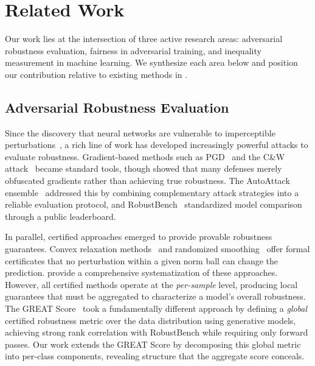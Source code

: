 \section{Related Work}
\label{sec:related_work}

Our work lies at the intersection of three active research areas: adversarial robustness evaluation, fairness in adversarial training, and inequality measurement in machine learning. We synthesize each area below and position our contribution relative to existing methods in .

\subsection{Adversarial Robustness Evaluation}
\label{sec:rw_evaluation}

Since the discovery that neural networks are vulnerable to imperceptible perturbations~\citep{szegedy2014intriguingpropertiesneuralnetworks, goodfellow2015explainingharnessingadversarialexamples}, a rich line of work has developed increasingly powerful attacks to evaluate robustness. Gradient-based methods such as PGD~\citep{madry2019deeplearningmodelsresistant} and the C\&W attack~\citep{carlini2017evaluatingrobustnessneuralnetworks} became standard tools, though \citet{athalye2018obfuscatedgradientsfalsesense} showed that many defenses merely obfuscated gradients rather than achieving true robustness. The AutoAttack ensemble~\citep{croce2020reliableevaluationadversarialrobustness} addressed this by combining complementary attack strategies into a reliable evaluation protocol, and RobustBench~\citep{croce2021robustbenchstandardizedadversarialrobustness} standardized model comparison through a public leaderboard.

In parallel, certified approaches emerged to provide provable robustness guarantees. Convex relaxation methods~\citep{wong2018provabledefensesadversarialexamples} and randomized smoothing~\citep{cohen2019certifiedadversarialrobustnessrandomized, lecuyer2019certifiedrobustnessadversarialexamples, salman2020provablyrobustdeeplearning} offer formal certificates that no perturbation within a given norm ball can change the prediction. \citet{li2023sokcertifiedrobustnessdeep} provide a comprehensive systematization of these approaches. However, all certified methods operate at the \emph{per-sample} level, producing local guarantees that must be aggregated to characterize a model's overall robustness. The GREAT Score~\citep{li2024greatscoreglobalrobustness} took a fundamentally different approach by defining a \emph{global} certified robustness metric over the data distribution using generative models, achieving strong rank correlation with RobustBench while requiring only forward passes. Our work extends the GREAT Score by decomposing this global metric into per-class components, revealing structure that the aggregate score conceals.

